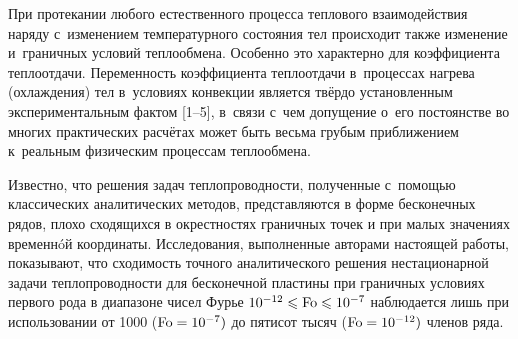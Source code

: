 





\date{19/IV/2008} 

\maketitle

При протекании любого естественного процесса теплового взаимодействия наряду 
с~изменением температурного состояния тел происходит также изменение 
и~граничных условий теплообмена. Особенно это характерно для коэффициента 
теплоотдачи. Переменность коэффициента теплоотдачи в~процессах нагрева 
(охлаждения) тел в~условиях конвекции является твёрдо установленным 
экспериментальным фактом [1--5], в~связи с~чем допущение о~его 
постоянстве во многих практических расчётах может быть весьма грубым 
приближением к~реальным физическим процессам теплообмена.

Известно, что решения задач теплопроводности, полученные с~помощью 
классических аналитических методов, представляются в форме бесконечных 
рядов, плохо сходящихся в окрестностях граничных точек и при малых значениях 
временн\'{o}й координаты. Исследования, выполненные авторами настоящей 
работы, показывают, что сходимость точного аналитического решения 
нестационарной задачи теплопроводности для бесконечной пластины при 
граничных условиях первого рода в диапазоне чисел Фурье 
$10^{-12}\leqslant {\rm Fo}\leqslant 10^{-7}$ наблюдается лишь при использовании от 1000 
(${\rm Fo}=10^{-7})$ до пятисот тысяч (${\rm Fo}=10^{-12})$ членов ряда.

